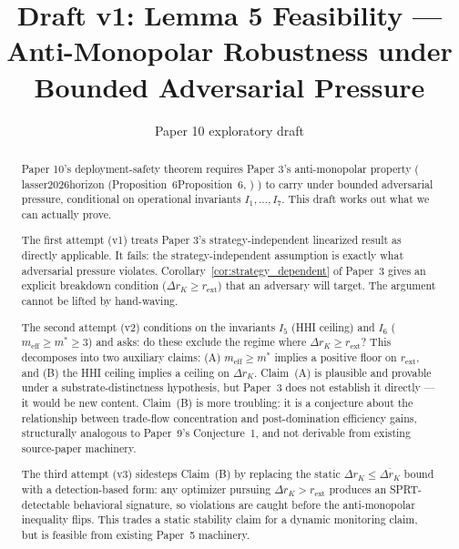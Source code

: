 \documentclass{article}
\title{Draft v1: Lemma 5 Feasibility ---\\
  Anti-Monopolar Robustness under Bounded Adversarial Pressure}
\author{Paper 10 exploratory draft}
\date{}
\makeatletter
\newcommand{\citep}[2][]{%
  \begingroup
  \def\@tmpkey{#2}%
  \ifx\@tmpkey\@empty\else
    (\ifx\@empty#1\@empty\else #1, \fi
     \@nameuse{bibkey@\@tmpkey})%
  \fi
  \endgroup
}
\newcommand{\rext}{r_{\mathrm{ext}}}
\newcommand{\meff}{m_{\mathrm{eff}}}
\makeatother
\begin{document}
\maketitle

\begin{abstract}
Paper 10's deployment-safety theorem requires Paper 3's anti-monopolar
property (\citep[Proposition~6]{lasser2026horizon}) to carry under bounded
adversarial pressure, conditional on operational invariants $I_1,
\ldots, I_7$.  This draft works out what we can actually prove.

The first attempt (v1) treats Paper 3's strategy-independent linearized
result as directly applicable.  It fails: the strategy-independent
assumption is exactly what adversarial pressure violates.
Corollary~\ref{cor:strategy_dependent} of Paper~3 gives an explicit
breakdown condition ($\Delta r_K \geq \rext$) that an adversary will
target.  The argument cannot be lifted by hand-waving.

The second attempt (v2) conditions on the invariants $I_5$ (HHI ceiling)
and $I_6$ ($\meff \geq m^* \geq 3$) and asks: do these exclude the
regime where $\Delta r_K \geq \rext$?  This decomposes into two
auxiliary claims: (A) $\meff \geq m^*$ implies a positive floor on
$\rext$, and (B) the HHI ceiling implies a ceiling on $\Delta r_K$.
Claim~(A) is plausible and provable under a substrate-distinctness
hypothesis, but Paper~3 does not establish it directly --- it would be
new content.  Claim~(B) is more troubling: it is a conjecture about the
relationship between trade-flow concentration and post-domination
efficiency gains, structurally analogous to Paper~9's Conjecture~1, and
not derivable from existing source-paper machinery.

The third attempt (v3) sidesteps Claim~(B) by replacing the static
$\Delta r_K \leq \overline{\Delta r_K}$ bound with a detection-based
form: any optimizer pursuing $\Delta r_K > \rext$ produces an
SPRT-detectable behavioral signature, so violations are caught before
the anti-monopolar inequality flips.  This trades a static stability
claim for a dynamic monitoring claim, but is feasible from existing
Paper~5 machinery.


\end{abstract}
\end{document}
